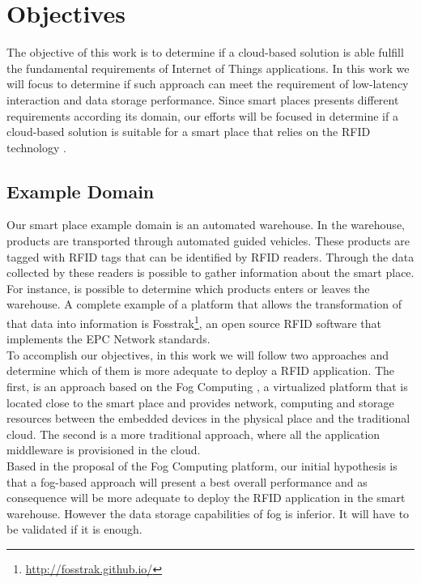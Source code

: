 \section{Objectives}
\label{section:objectives}
The objective of this work is to determine if a cloud-based solution is able fulfill the fundamental
requirements of Internet of Things applications. In this work we will focus to determine if such approach
can meet the requirement of low-latency interaction and data storage performance. Since smart places
presents different requirements according its domain, our efforts will be focused in determine if a
cloud-based solution is suitable for a smart place that relies on the RFID technology \cite{want2006introduction}.\\

\subsection{Example Domain}
\label{sub:domain}
Our smart place example domain is an automated warehouse. In the warehouse, products are transported
through automated guided vehicles. These products are tagged with \gls{RFID} tags that can be identified
by \gls{RFID} readers.  Through the data collected by these readers is possible to gather information
about the smart place. For instance, is possible to determine which products enters or leaves the
warehouse. A complete example of a platform that allows the transformation of that data into
information is Fosstrak\footnote{\url{http://fosstrak.github.io/}}, an open source \gls{RFID}
software that implements the \gls{EPC} Network standards.\\

To accomplish our objectives, in this work we will follow two approaches and determine which of them
is more adequate to deploy a \gls{RFID} application. The first, is an approach based on the Fog Computing
\cite{bonomi2012fog}, a virtualized platform that is located close to the smart place and provides network,
computing and storage resources between the embedded devices in the physical place and the traditional
cloud. The second is a more traditional approach, where all the application middleware is provisioned
in the cloud.\\

Based in the proposal of the Fog Computing platform, our initial hypothesis is that a fog-based approach
will present a best overall performance and as consequence will be more adequate to deploy the \gls{RFID}
application in the smart warehouse. However the data storage capabilities of fog is inferior. It will
have to be validated if it is enough.

